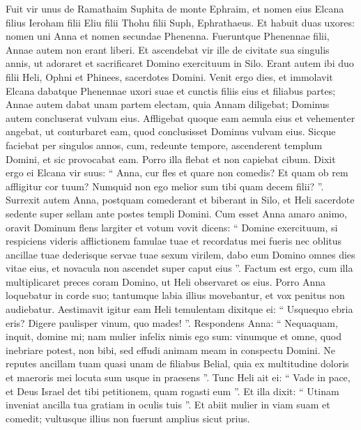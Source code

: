 \begin{biblechapter}
 \verse Fuit vir unus de Ramathaim Suphita de monte Ephraim, et nomen eius Elcana filius Ieroham filii Eliu filii Thohu filii Suph, Ephrathaeus. 
\verse Et habuit duas uxores: nomen uni Anna et nomen secundae Phenenna. Fueruntque Phenennae filii, Annae autem non erant liberi.
 \verse Et ascendebat vir ille de civitate sua singulis annis, ut adoraret et sacrificaret Domino exercituum in Silo. Erant autem ibi duo filii Heli, Ophni et Phinees, sacerdotes Domini.
 \verse Venit ergo dies, et immolavit Elcana dabatque Phenennae uxori suae et cunctis filiis eius et filiabus partes; 
\verse Annae autem dabat unam partem electam, quia Annam diligebat; Dominus autem concluserat vulvam eius. 
\verse Affligebat quoque eam aemula eius et vehementer angebat, ut conturbaret eam, quod conclusisset Dominus vulvam eius. 
\verse Sicque faciebat per singulos annos, cum, redeunte tempore, ascenderent templum Domini, et sic provocabat eam. Porro illa flebat et non capiebat cibum. 
\verse Dixit ergo ei Elcana vir suus: “ Anna, cur fles et quare non comedis? Et quam ob rem affligitur cor tuum? Numquid non ego melior sum tibi quam decem filii? ”.
 \verse Surrexit autem Anna, postquam comederant et biberant in Silo, et Heli sacerdote sedente super sellam ante postes templi Domini. 
\verse Cum esset Anna amaro animo, oravit Dominum flens largiter 
\verse et votum vovit dicens: “ Domine exercituum, si respiciens videris afflictionem famulae tuae et recordatus mei fueris nec oblitus ancillae tuae dederisque servae tuae sexum virilem, dabo eum Domino omnes dies vitae eius, et novacula non ascendet super caput eius ”.
 \verse Factum est ergo, cum illa multiplicaret preces coram Domino, ut Heli observaret os eius. 
\verse Porro Anna loquebatur in corde suo; tantumque labia illius movebantur, et vox penitus non audiebatur. Aestimavit igitur eam Heli temulentam 
\verse dixitque ei: “ Usquequo ebria eris? Digere paulisper vinum, quo mades! ”. 
\verse Respondens Anna: “ Nequaquam, inquit, domine mi; nam mulier infelix nimis ego sum: vinumque et omne, quod inebriare potest, non bibi, sed effudi animam meam in conspectu Domini. 
\verse Ne reputes ancillam tuam quasi unam de filiabus Belial, quia ex multitudine doloris et maeroris mei locuta sum usque in praesens ”. 
\verse Tunc Heli ait ei: “ Vade in pace, et Deus Israel det tibi petitionem, quam rogasti eum ”. 
\verse Et illa dixit: “ Utinam inveniat ancilla tua gratiam in oculis tuis ”. Et abiit mulier in viam suam et comedit; vultusque illius non fuerunt amplius sicut prius. 

\end{biblechapter}

